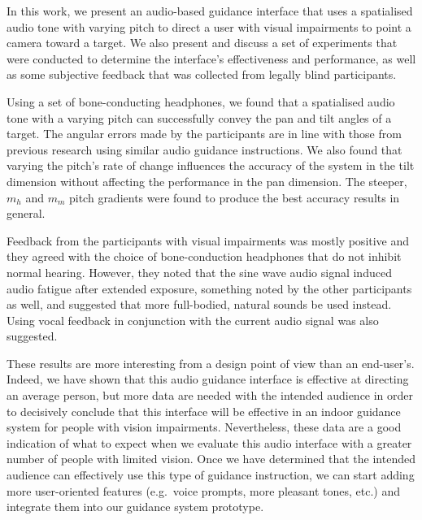 \documentclass{llncs}
\begin{document}
In this work, we present an audio-based guidance interface that uses a spatialised audio tone with varying pitch to direct a user with visual impairments to point a camera toward a target. 
We also present and discuss a set of experiments that were conducted to determine the interface's effectiveness and performance, as well as some subjective feedback that was collected from legally blind participants. 

Using a set of bone-conducting headphones, we found that a spatialised audio tone with a varying pitch can successfully convey the pan and tilt angles of a target.
The angular errors made by the participants are in line with those from previous research using similar audio guidance instructions.
We also found that varying the pitch's rate of change influences the accuracy of the system in the tilt dimension without affecting the performance in the pan dimension.
The steeper, $m_h$ and $m_m$ pitch gradients were found to produce the best accuracy results in general.

Feedback from the participants with visual impairments was mostly positive and they agreed with the choice of bone-conduction headphones that do not inhibit normal hearing.
However, they noted that the sine wave audio signal induced audio fatigue after extended exposure, something noted by the other participants as well, and suggested that more full-bodied, natural sounds be used instead.
Using vocal feedback in conjunction with the current audio signal was also suggested. 

These results are more interesting from a design point of view than an end-user's. 
Indeed, we have shown that this audio guidance interface is effective at directing an average person, but more data are needed with the intended audience in order to decisively conclude that this interface will be effective in an indoor guidance system for people with vision impairments. 
Nevertheless, these data are a good indication of what to expect when we evaluate this audio interface with a greater number of people with limited vision.
Once we have determined that the intended audience can effectively use this type of guidance instruction, we can start adding more user-oriented features (e.g.\ voice prompts, more pleasant tones, etc.) and integrate them into our guidance system prototype. 



\end{document}
